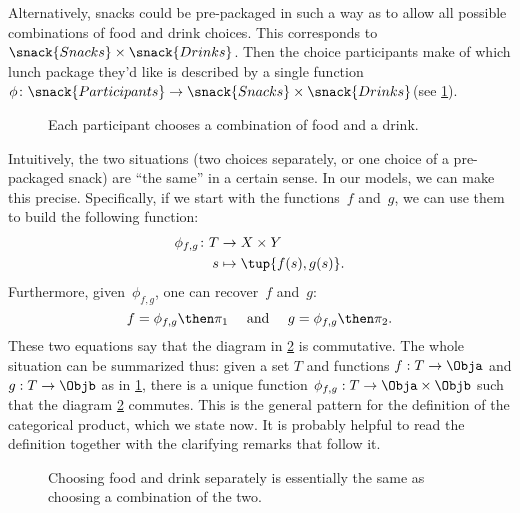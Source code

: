 Alternatively, snacks could be pre-packaged in such a way as to allow all possible combinations of food and drink choices. This corresponds to~$\snack{Snacks}\times \snack{Drinks}$.
Then the choice participants make of which lunch package they'd like is described by a single function~$\phi\colon \snack{Participants}\to \snack{Snacks}\times \snack{Drinks}$(see \cref{fig:snacks_2}).

\begin{figure}[h!]
  \begin{center}
  \end{center}
  \caption{Each participant chooses a combination of food and a drink. \label{fig:snacks_2}}
\end{figure}


Intuitively, the two situations (two choices separately, or one choice of a pre-packaged snack) are ``the same'' in a certain sense.
In our models, we can make this precise.
Specifically, if we start with the functions~$f$ and~$g$, we can use them to build the following function:
\begin{equation*}
  \begin{aligned}
    \phi_{f,g}\colon T&\to X\times Y\\
    s&\mapsto \tup{f(s),g(s)}.
  \end{aligned}
\end{equation*}
Furthermore, given~$\phi_{f,g}$, one can recover~$f$ and~$g$:
\begin{equation*}
  f=\phi_{f,g}\then \pi_1 \quad  \text{ and } \quad g=\phi_{f,g}\then \pi_2.
\end{equation*}
These two equations say that the diagram in \cref{fig:snacks_3} is commutative.
The whole situation can be summarized thus: given a set $T$ and functions $f: T \rightarrow \Obja$ and $g: T \rightarrow \Objb$ as in \cref{fig:snacks_2}, there is a unique function $\phi_{f,g} : T \rightarrow \Obja \times \Objb$ such that the diagram \cref{fig:snacks_3} commutes.
This is the general pattern for the definition of the categorical product, which we state now.
It is probably helpful to read the definition together with the clarifying remarks that follow it.

\begin{figure}[h!]
  \begin{center}
  \end{center}
  \caption{Choosing food and drink separately is essentially the same as choosing a combination of the two. \label{fig:snacks_3}}
\end{figure}

